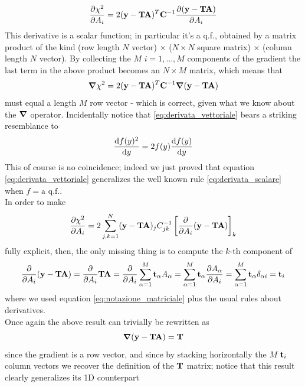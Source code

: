\documentclass[a4paper]{article}
\newcommand{\mat}[1]{\vb{#1}}
\newcommand{\quadre}[1]{\left[ {#1} \right]}
\begin{document}
\begin{equation*}
    \pdv{\chi^2}{A_i} = 2 (\vb{y}-\mat{T}\vb{A})^T \mat{C}^{-1} \pdv{(\vb{y}-\mat{T}\vb{A})}{A_i}
\end{equation*}
This derivative is a scalar function; in particular it's a q.f., obtained by a matrix product of the kind (row length $N$ vector) $\times$ ($N\times N$ square matrix) $\times$ (column length $N$ vector). By collecting the $M$ $i=1, \dots, M$ components of the gradient the last term in the above product becomes an $N\times M$ matrix, which means that
\begin{equation}
\label{eq:derivata_vettoriale}
    \grad\chi^2 = 2(\vb{y}-\mat{T}\vb{A})^T \mat{C}^{-1} \grad(\vb{y}-\mat{T}\vb{A})
\end{equation}
must equal a length $M$ row vector - which is correct, given what we know about the $\grad$ operator. Incidentally notice that \eqref{eq:derivata_vettoriale} bears a striking resemblance to 
\begin{equation}
\label{eq:derivata_scalare}
    \dv{f(y)^2}{y} = 2 f(y) \dv{f(y)}{y}
\end{equation}
This of course is no coincidence; indeed we just proved that equation \eqref{eq:derivata_vettoriale} generalizes the well known rule \eqref{eq:derivata_scalare} when $f = \text{a q.f.}$.\\
In order to make 
\begin{equation*}
    \pdv{\chi^2}{A_i} = 2 \sum_{j,k=1}^N (\vb{y}-\mat{T}\vb{A})_j C_{jk}^{-1} \quadre{\pdv{A_i}(\vb{y}-\mat{T}\vb{A})}_k
\end{equation*}
fully explicit, then, the only missing thing is to compute the $k$-th component of
\begin{equation*}
    \pdv{A_i}(\vb{y}-\mat{T}\vb{A}) = \pdv{A_i} \mat{T}\vb{A} = \pdv{A_i}\sum_{\alpha = 1}^M \vb{t}_\alpha A_\alpha = \sum_{\alpha=1}^M \vb{t}_\alpha \pdv{A_\alpha}{A_i} = \sum_{\alpha=1}^M \vb{t}_\alpha \delta_{\alpha i} = \vb{t}_i
\end{equation*}
where we used equation \eqref{eq:notazione_matriciale} plus the usual rules about derivatives.\\
Once again the above result can trivially be rewritten as 
\begin{equation*}
    \grad (\vb{y}-\mat{T}\vb{A}) = \mat{T}
\end{equation*}
since the gradient is a row vector, and since by stacking horizontally the $M$ $\vb{t}_i$ column vectors we recover the definition of the $\mat{T}$ matrix; notice that this result clearly generalizes its 1D counterpart
\end{document}
